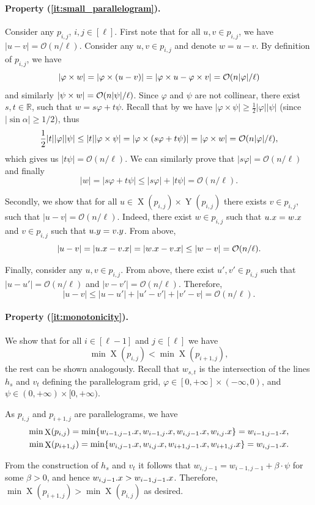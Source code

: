 \documentclass[11pt, letterpaper]{article}
\theoremstyle{plain}
\theoremstyle{definition}
\theoremstyle{remark}
\renewcommand{\O}{\mathcal{O}}
\renewcommand{\phi}{\varphi}
\DeclareMathOperator*{\X}{X}
\DeclareMathOperator*{\Y}{Y}
\begin{document}
\paragraph*{Property (\ref{it:small_parallelogram}).}
Consider any $p_{i,j}$, $i,j \in [\ell]$. First note that	for all $u, v \in p_{i, j}$, we have $|u - v| = \O(n / \ell)$. Consider any $u, v \in p_{i, j}$ and denote $w = u - v$.
By definition of $p_{i, j}$, we have
\[ |\h{w}| = |\h{(u - v)}| = |\h{u} - \h{v}| = \O(n|\phi| / \ell) \]
and similarly $|\s{w}| = \O(n|\psi| / \ell)$. Since $\phi$ and $\psi$ are not collinear, there exist $s, t \in \mathbb{R}$, such that $w = s\phi + t\psi$. Recall that by  we have $|\phi \times \psi| \ge \frac{1}{2}|\phi||\psi|$ (since $|\sin \alpha| \ge 1/2$), thus
\[ \frac{1}{2}|t||\phi||\psi| \le |t||\phi \times \psi| = |\phi \times (s\phi + t\psi)| = |\h{w}| = \O(n|\phi| / \ell), \]
which gives us $|t\psi| = \O(n / \ell)$. We can similarly prove that $|s\phi| = \O(n / \ell)$ and finally 
\[ |w| = |s\phi + t\psi| \le |s\phi| + |t\psi| = \O(n / \ell). \]

Secondly, we show that	for all $u \in \X(p_{i, j}) \times \Y(p_{i, j})$ there exists $v \in p_{i, j}$, such that $|u - v| = \O(n / \ell)$. Indeed, there exist $w \in p_{i, j}$ such that $u.x = w.x$ and $v \in p_{i, j}$ such that $u.y = v.y$. From above, 
\[|u - v| = |\x{u} - \x{v}| = |\x{w} - \x{v}| \le |w - v| = \O(n / \ell).\] 

Finally, consider any $u, v \in p_{i, j}$. From above, there exist $u', v' \in p_{i, j}$ such that $|u - u'| = \O(n / \ell)$ and $|v - v'| = \O(n / \ell)$. Therefore, 
\[ |u - v| \le |u - u'| + |u' - v'| + |v' - v| = \O(n / \ell). \]

\paragraph*{Property (\ref{it:monotonicity}).} 
We show that for all $i \in [\ell - 1]$ and $j \in [\ell]$ we have
$$\min \X(p_{i, j}) < \min \X(p_{i + 1, j}),$$
the rest can be shown analogously. Recall that $w_{s,t}$ is the intersection of the lines $h_s$ and $v_t$ defining the parallelogram grid, $\phi \in [0, +\infty] \times (-\infty,0)$, and $\psi \in (0,+\infty) \times [0,+\infty)$. 

As $p_{i,j}$ and $p_{i+1,j}$ are parallelograms, we have 
\begin{align*}
\min \X(p_{i, j}) = \min\{\x{w_{i-1,j-1}}, \x{w_{i-1,j}}, \x{w_{i,j-1}},\x{w_{i,j}}\} = \x{w_{i-1,j-1}},\\ 
\min \X(p_{i+1, j}) = \min\{\x{w_{i,j-1}}, \x{w_{i,j}}, \x{w_{i+1,j-1}},\x{w_{i+1,j}}\} = \x{w_{i,j-1}}.
\end{align*}

From the construction of $h_s$ and $v_t$ it follows that $w_{i,j-1} = w_{i-1,j-1} + \beta \cdot \psi$ for some $\beta > 0$, and hence $w_{i,j-1}.x > w_{i-1,j-1}.x$. Therefore, $\min \X(p_{i+1, j}) > \min \X(p_{i, j})$ as desired. 
\end{document}
